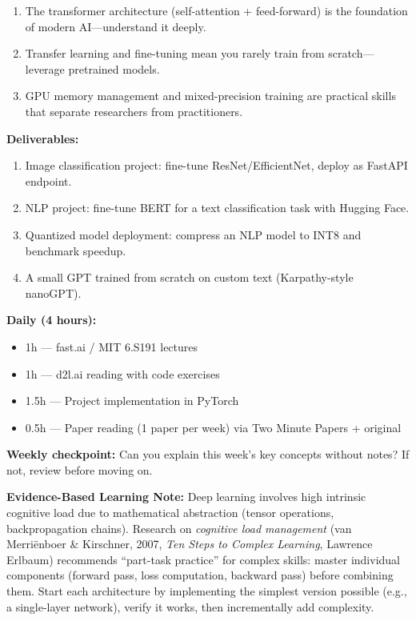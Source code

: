 \documentclass[11pt, a4paper, oneside]{report}
\begin{document}
\begin{takeawaybox}
\begin{enumerate}[leftmargin=*]
\item The transformer architecture (self-attention + feed-forward) is the foundation of modern AI---understand it deeply.
\item Transfer learning and fine-tuning mean you rarely train from scratch---leverage pretrained models.
\item GPU memory management and mixed-precision training are practical skills that separate researchers from practitioners.
\end{enumerate}
\end{takeawaybox}

\begin{milestonebox}
\textbf{Deliverables:}
\begin{enumerate}[leftmargin=*]
\item Image classification project: fine-tune ResNet/EfficientNet, deploy as FastAPI endpoint.
\item NLP project: fine-tune BERT for a text classification task with Hugging Face.
\item Quantized model deployment: compress an NLP model to INT8 and benchmark speedup.
\item A small GPT trained from scratch on custom text (Karpathy-style nanoGPT).
\end{enumerate}
\end{milestonebox}

\begin{practicebox}
\textbf{Daily (4 hours):}
\begin{itemize}[leftmargin=*]
\item 1h --- fast.ai / MIT 6.S191 lectures
\item 1h --- d2l.ai reading with code exercises
\item 1.5h --- Project implementation in PyTorch
\item 0.5h --- Paper reading (1 paper per week) via Two Minute Papers + original
\end{itemize}


\textbf{Weekly checkpoint:} Can you explain this week's key concepts without notes? If not, review before moving on.

\textbf{Evidence-Based Learning Note:} Deep learning involves high intrinsic cognitive load due to mathematical abstraction (tensor operations, backpropagation chains). Research on \emph{cognitive load management} (van Merri\"enboer \& Kirschner, 2007, \emph{Ten Steps to Complex Learning}, Lawrence Erlbaum) recommends ``part-task practice'' for complex skills: master individual components (forward pass, loss computation, backward pass) before combining them. Start each architecture by implementing the simplest version possible (e.g., a single-layer network), verify it works, then incrementally add complexity.

\end{practicebox}
\end{document}
